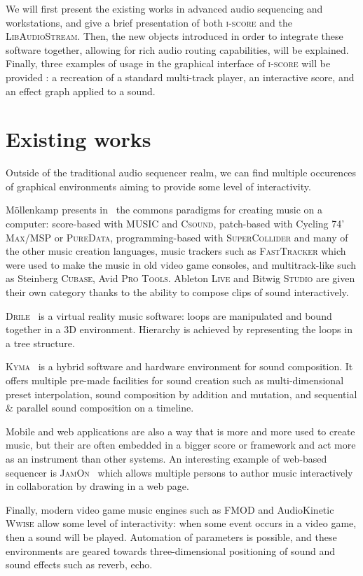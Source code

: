 \documentclass{article}
\newcommand*{\LibAudioStream}{\textsc{LibAudioStream}\xspace}
\newcommand*{\iscore}{\textsc{i-score}\xspace}
\newcommand*{\maxmsp}{Cycling 74' \textsc{Max/MSP}\xspace}
\newcommand*{\puredata}{\textsc{PureData}\xspace}
\newcommand*{\csound}{\textsc{Csound}\xspace}
\newcommand*{\supercollider}{\textsc{SuperCollider}\xspace}
\newcommand*{\abletonlive}{Ableton \textsc{Live}\xspace}
\newcommand*{\bitwigstudio}{Bitwig \textsc{Studio}\xspace}
\newcommand*{\fasttracker}{\textsc{FastTracker}\xspace}
\newcommand*{\cubase}{Steinberg \textsc{Cubase}\xspace}
\newcommand*{\protools}{Avid \textsc{Pro Tools}\xspace}
\newcommand*{\MUSIC}{\textsc{MUSIC}\xspace}
\newcommand*{\drile}{\textsc{Drile}\xspace}
\newcommand*{\jamon}{\textsc{JamOn}\xspace}
\newcommand*{\wwise}{AudioKinetic \textsc{Wwise}\xspace}
\newcommand*{\fmod}{\textsc{FMOD}\xspace}
\newcommand*{\kyma}{\textsc{Kyma}\xspace}
\begin{document}
We will first present the existing works in advanced audio sequencing and workstations, 
and give a brief presentation of both \iscore and the \LibAudioStream.
Then, the new objects introduced in order to integrate these software together, allowing 
for rich audio routing capabilities, will be explained.
Finally, three examples of usage in the graphical interface of \iscore will be provided : a recreation of a standard multi-track player, an interactive score, and an effect graph applied to a sound.

\section{Existing works}
Outside of the traditional audio sequencer realm, we can find 
multiple occurences of graphical environments aiming to provide 
some level of interactivity.

M{\"o}llenkamp presents in~\cite{mollenkampparadigms} the 
commons paradigms for creating music on a computer: score-based with \MUSIC and \csound, 
patch-based with \maxmsp or \puredata, programming-based with \supercollider and many of the other music creation languages, music trackers such as \fasttracker which were used to make the music in old video game consoles, and multitrack-like such as \cubase, \protools.
\abletonlive and \bitwigstudio are given their own category thanks to the ability to compose clips of sound interactively.

\drile~\cite{berthaut2010drile} is a virtual reality music software: loops are manipulated and bound together in a 3D environment. Hierarchy is achieved by representing the loops in a tree structure.

\kyma~\cite{scaletti1989kyma} is a hybrid software and hardware environment for sound composition. 
It offers multiple pre-made facilities for sound creation such as multi-dimensional preset interpolation, sound composition by addition and mutation, and sequential \& parallel sound composition on a timeline.

Mobile and web applications are also a way that is more and more used to create music, 
but their are often embedded in a bigger score or framework and act more as an instrument than other systems.
An interesting example of web-based sequencer is \jamon~\cite{rosselet2013jam} which allows multiple persons to author music interactively in collaboration by drawing in a web page.

Finally, modern video game music engines such as \fmod and \wwise allow some level of interactivity: when some event occurs in a video game, then a sound will be played. 
Automation of parameters is possible, and these environments are geared towards three-dimensional positioning of sound and sound effects such as reverb, echo.
\end{document}
